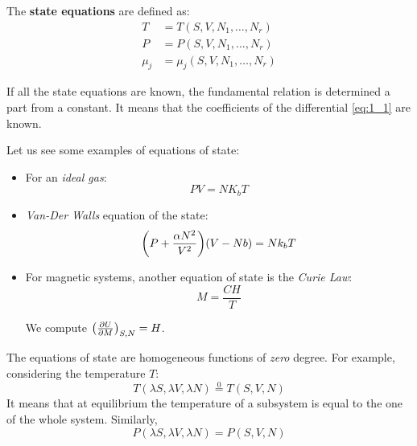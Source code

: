 \documentclass[../../Main/Main.tex]{subfiles}
\begin{document}
 The \textbf{state equations} are defined as:
\begin{subequations}
\begin{align}
  T &= T (S,V,N_1,\dots,N_r) \\
  P &= P (S,V,N_1,\dots,N_r) \\
  \mu _j &= \mu _j (S,V,N_1,\dots,N_r)
\end{align}
\label{}
\end{subequations}
\begin{remark}
If all the state equations are known, the fundamental relation is determined a part from a constant. It means that the coefficients of the differential \eqref{eq:1_1} are known.
\end{remark}
\begin{example}{}{}
Let us see some examples of equations of state:
\begin{itemize}
\item For an \emph{ideal gas}:
\begin{equation}
  P V = N K_b T
\end{equation}
\item \emph{Van-Der Walls} equation of the state:
\begin{equation}
  \qty(P+\frac{\alpha N^2}{V^2})\qty(V-Nb) = N k_b T
\end{equation}
\item For magnetic systems, another equation of state is the \emph{Curie Law}:
\begin{equation}
M=\frac{C H}{T}
\end{equation}
\begin{remark}
We compute \( \qty(\pdv{U}{M} )_{S,N}=H  \).
\end{remark}
\end{itemize}
\end{example}

The equations of state are homogeneous functions of \emph{zero} degree. For example, considering the temperature \( T \):
\begin{equation*}
  T (\lambda S, \lambda V, \lambda N) \overset{0}{=} T (S,V,N)
\end{equation*}
It means that at equilibrium the temperature of a subsystem is equal to the one of the whole system.
Similarly,
\begin{equation*}
  P (\lambda S, \lambda V, \lambda N) = P (S,V,N)
\end{equation*}
\end{document}
